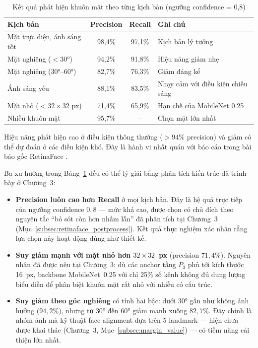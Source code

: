 \begin{table}[H]
\caption{Kết quả phát hiện khuôn mặt theo từng kịch bản (ngưỡng confidence = 0,8)}
\label{tab:detection_eval}
\centering
\begin{tabular}{|p{4cm}|c|c|p{4cm}|}
\hline
\textbf{Kịch bản} & \textbf{Precision} & \textbf{Recall} & \textbf{Ghi chú} \\
\hline
Mặt trực diện, ánh sáng tốt & 98,4\% & 97,1\% & Kịch bản lý tưởng \\
\hline
Mặt nghiêng ($<30°$) & 94,2\% & 91,8\% & Hiệu năng giảm nhẹ \\
\hline
Mặt nghiêng ($30°$--$60°$) & 82,7\% & 76,3\% & Giảm đáng kể \\
\hline
Ánh sáng yếu & 88,1\% & 83,5\% & Nhạy cảm với điều kiện chiếu sáng \\
\hline
Mặt nhỏ ($< 32 \times 32$ px) & 71,4\% & 65,9\% & Hạn chế của MobileNet 0.25 \\
\hline
Nhiều khuôn mặt & 95,7\% & -- & Chọn mặt lớn nhất \\
\hline
\end{tabular}
\end{table}


Hiệu năng phát hiện cao ở điều kiện thông thường ($>94\%$ precision) và giảm có thể dự đoán ở các điều kiện khó. Đây là hành vi nhất quán với báo cáo trong bài báo gốc RetinaFace \cite{Deng2019RetinaFace}.

Ba xu hướng trong Bảng~\ref{tab:detection_eval} đều có thể lý giải bằng phân tích kiến trúc đã trình bày ở Chương~3:

\begin{itemize}
    \item \textbf{Precision luôn cao hơn Recall} ở mọi kịch bản. Đây là hệ quả trực tiếp của ngưỡng confidence $0{,}8$ --- mức khá cao, được chọn có chủ đích theo nguyên tắc ``bỏ sót còn hơn nhầm lẫn'' đã phân tích tại Chương~3 (Mục~\ref{subsec:retinaface_postprocess}). Kết quả thực nghiệm xác nhận rằng lựa chọn này hoạt động đúng như thiết kế.
    \item \textbf{Suy giảm mạnh với mặt nhỏ hơn $32\times32$~px} (precision $71{,}4\%$). Nguyên nhân đã được nêu tại Chương~3: dù các anchor tầng $P_3$ phủ tới kích thước 16~px, backbone MobileNet~0.25 với chỉ 25\% số kênh không đủ dung lượng biểu diễn để phân biệt khuôn mặt rất nhỏ với nhiễu có cấu trúc.
    \item \textbf{Suy giảm theo góc nghiêng} có tính hai bậc: dưới $30°$ gần như không ảnh hưởng ($94{,}2\%$), nhưng từ $30°$ đến $60°$ giảm mạnh xuống $82{,}7\%$. Đây chính là nhóm ảnh mà kỹ thuật face alignment dựa trên 5 landmark --- hiện chưa được khai thác (Chương~3, Mục~\ref{subsec:margin_value}) --- có tiềm năng cải thiện lớn nhất.
\end{itemize}

